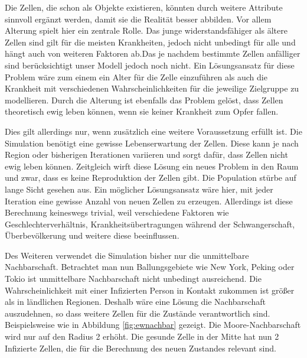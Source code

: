 \documentclass[10pt,twocolumn]{scrartcl}
\begin{document}
Die Zellen, die schon als Objekte existieren, könnten durch weitere Attribute sinnvoll ergänzt werden, damit sie die Realität besser abbilden.
Vor allem Alterung spielt hier ein zentrale Rolle. Das junge widerstandsfähiger als ältere Zellen sind gilt für die meisten Krankheiten, jedoch nicht unbedingt für alle und hängt auch von weiteren Faktoren ab.Das je nachdem bestimmte Zellen anfälliger sind berücksichtigt unser Modell jedoch noch nicht. Ein Lösungsansatz für diese Problem wäre zum einem ein Alter für die Zelle einzuführen als auch die Krankheit mit verschiedenen Wahrscheinlichkeiten für die jeweilige Zielgruppe zu modellieren. 
Durch die Alterung ist  ebenfalls das Problem gelöst, dass Zellen theoretisch ewig leben können, wenn sie keiner Krankheit zum Opfer fallen. 

Dies gilt allerdings nur, wenn zusätzlich eine weitere Voraussetzung erfüllt ist. Die Simulation benötigt eine gewisse Lebenserwartung der Zellen. Diese kann je nach Region oder bisherigen Iterationen variieren und sorgt dafür, dass Zellen nicht ewig leben können.
Zeitgleich wirft diese Lösung ein neues Problem in den Raum und zwar, dass es keine Reproduktion der Zellen gibt. Die Population stürbe auf lange Sicht gesehen aus. Ein möglicher Lösungsansatz wäre hier, mit jeder Iteration eine gewisse Anzahl von neuen Zellen zu erzeugen. Allerdings ist diese Berechnung keineswegs trivial, weil verschiedene Faktoren wie Geschlechterverhältnis, Krankheitsübertragungen während der Schwangerschaft, Überbevölkerung und weitere diese beeinflussen.

Des Weiteren verwendet die Simulation bisher nur die unmittelbare Nachbarschaft. Betrachtet man nun Ballungsgebiete wie New York, Peking oder Tokio ist unmittelbare Nachbarschaft nicht unbedingt ausreichend. Die Wahrscheinlichkeit mit einer Infizierten Person in Kontakt zukommen ist größer als in ländlichen Regionen. Deshalb wäre eine Lösung die Nachbarschaft auszudehnen, so dass weitere Zellen für die Zustände verantwortlich sind. Beispielsweise wie in Abbildung \ref{fig:ewnachbar} gezeigt. Die Moore-Nachbarschaft wird nur auf den Radius 2 erhöht. Die gesunde Zelle in der Mitte hat nun 2 Infizierte Zellen, die für die Berechnung des neuen Zustandes relevant sind. 
\end{document}
